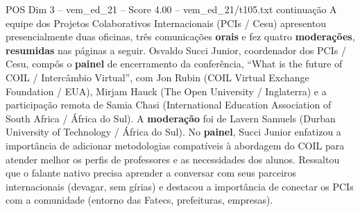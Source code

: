 \begin{textsample}{POS Dim 3 – vem\_ed\_21 – Score 4.00 – vem\_ed\_21/t105.txt}  \label{ex:f3_pos_106}
continuação A equipe dos Projetos Colaborativos Internacionais (PCIs / Cesu) apresentou presencialmente duas oficinas, três comunicações \textbf{orais} e fez quatro \textbf{moderações}, \textbf{resumidas} nas páginas a seguir.
Osvaldo Succi Junior, coordenador dos PCIs / Cesu, compôs o \textbf{painel} de encerramento da conferência, “What is the future of COIL / Intercâmbio Virtual”, com Jon Rubin (COIL Virtual Exchange Foundation / EUA), Mirjam Hauck (The Open University / Inglaterra) e a participação remota de Samia Chasi (International Education Association of South Africa / África do Sul).
A \textbf{moderação} foi de Lavern Samuels (Durban University of Technology / África do Sul).
No \textbf{painel}, Succi Junior enfatizou a importância de adicionar metodologias compatíveis à abordagem do COIL para atender melhor os perfis de professores e as necessidades dos alunos.
Ressaltou que o falante nativo precisa aprender a conversar com seus parceiros internacionais (devagar, sem gírias) e destacou a importância de conectar os PCIs com a comunidade (entorno das Fatecs, prefeituras, empresas).

\end{textsample}
